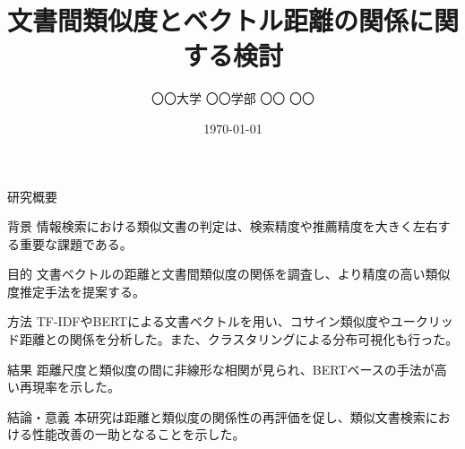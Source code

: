 \documentclass[dvipdfmx]{beamer} %
\title{文書間類似度とベクトル距離の関係に関する検討}
\author{〇〇大学 〇〇学部 〇〇 〇〇}
\date{\today}
\begin{document}
\begin{frame}[fragile]{研究概要}
\small
\begin{block}{背景}
情報検索における類似文書の判定は、検索精度や推薦精度を大きく左右する重要な課題である。
\end{block}

\vspace{0.4em}
\begin{block}{目的}
文書ベクトルの距離と文書間類似度の関係を調査し、より精度の高い類似度推定手法を提案する。
\end{block}

\vspace{0.4em}
\begin{block}{方法}
TF-IDFやBERTによる文書ベクトルを用い、コサイン類似度やユークリッド距離との関係を分析した。また、クラスタリングによる分布可視化も行った。
\end{block}

\vspace{0.4em}
\begin{block}{結果}
距離尺度と類似度の間に非線形な相関が見られ、BERTベースの手法が高い再現率を示した。
\end{block}

\vspace{0.4em}
\begin{block}{結論・意義}
本研究は距離と類似度の関係性の再評価を促し、類似文書検索における性能改善の一助となることを示した。
\end{block}
\end{frame}
\end{document}
